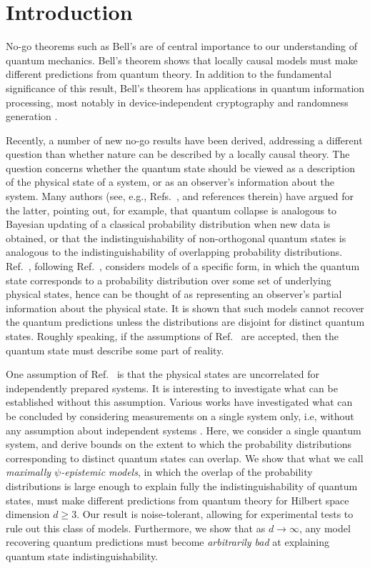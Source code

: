 
\section*{Introduction}

No-go theorems such as Bell's \cite{Bell1964} are of central importance to our understanding of quantum mechanics. Bell's theorem shows that locally causal models must make different predictions from quantum theory. In addition to the fundamental significance of this result, Bell's theorem has applications in quantum information processing, most notably in device-independent cryptography and randomness generation \cite{Ekert1991, Barrett2005, Cavalcanti2012, Pironio2010}. 

Recently, a number of new no-go results have been derived, addressing a different question than whether nature can be described by a locally causal theory.  The question concerns whether the quantum state should be viewed as a description of the physical state of a system, or as an observer's information about the system. Many authors (see, e.g., Refs.~\cite{Spekkens2005, Bartlett2011, Fuchs2013}, and references therein) have argued for the latter, pointing out, for example, that quantum collapse is analogous to Bayesian updating of a classical probability distribution when new data is obtained, or that the indistinguishability of non-orthogonal quantum states is analogous to the indistinguishability of overlapping probability distributions. Ref.~\cite{Pusey2012}, following Ref.~\cite{Harrigan2010}, considers models of a specific form, in which the quantum state corresponds to a probability distribution over some set of underlying physical states, hence can be thought of as representing an observer's partial information about the physical state. It is shown that such models cannot recover the quantum predictions unless the distributions are disjoint for distinct quantum states. Roughly speaking, if the assumptions of Ref.~\cite{Pusey2012} are accepted, then the quantum state must describe some part of reality.

One assumption of Ref.~\cite{Pusey2012} is that the physical states are uncorrelated for independently prepared systems. It is interesting to investigate what can be established without this assumption. Various works have investigated what can be concluded by considering measurements on a single system only, i.e, without any assumption about independent systems \cite{Lewis2012,Maroney2012a,Leifer2013, Patra2013, Aaronson2013}. Here, we consider a single quantum system, and derive bounds on the extent to which the probability distributions corresponding to distinct quantum states can overlap. We show that what we call \emph{maximally $\psi$-epistemic models}, in which the overlap of the probability distributions is large enough to explain fully the indistinguishability of quantum states, must make different predictions from quantum theory for Hilbert space dimension $d\geq 3$. Our result is noise-tolerant, allowing for experimental tests to rule out this class of models. Furthermore, we show that as $d\rightarrow\infty$, any model recovering quantum predictions must become \emph{arbitrarily bad} at explaining quantum state indistinguishability. 


